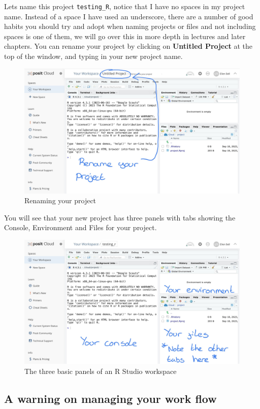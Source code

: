 \documentclass[
]{book}
\begin{document}
Lets name this project \texttt{testing\_R}, notice that I have no spaces in my project name. Instead of a space I have used an underscore, there are a number of good habits you should try and adopt when naming projects or files and not including spaces is one of them, we will go over this in more depth in lectures and later chapters. You can rename your project by clicking on \textbf{Untitled Project} at the top of the window, and typing in your new project name.

\begin{figure}
\includegraphics[width=0.9\linewidth]{figures/posit3} \caption{Renaming your project}\label{fig:unnamed-chunk-3}
\end{figure}

You will see that your new project has three panels with tabs showing the Console, Environment and Files for your project.

\begin{figure}
\includegraphics[width=0.9\linewidth]{figures/posit4} \caption{The three basic panels of an R Studio workspace}\label{fig:unnamed-chunk-4}
\end{figure}

\hypertarget{a-warning-on-managing-your-work-flow}{%
\subsection{A warning on managing your work flow}\label{a-warning-on-managing-your-work-flow}}
\end{document}

